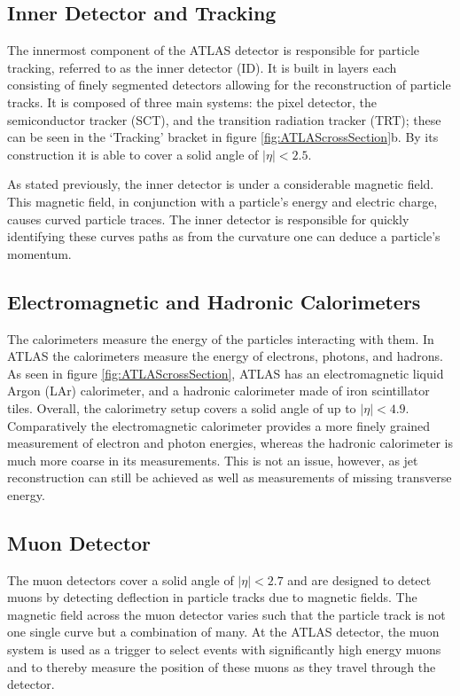 \subsection{Inner Detector and Tracking}
The innermost component of the ATLAS detector is responsible for particle tracking, referred to as the inner detector (ID).
It is built in layers each consisting of finely segmented detectors allowing for the reconstruction of particle tracks.
It is composed of three main systems: the pixel detector, the semiconductor tracker (SCT), and the transition radiation tracker (TRT); these can be seen in the `Tracking' bracket in figure \ref{fig:ATLAScrossSection}b.
By its construction it is able to cover a solid angle of $\left | \eta \right | < 2.5$.

As stated previously, the inner detector is under a considerable magnetic field. 
This magnetic field, in conjunction with a particle's energy and electric charge, causes curved particle traces.
The inner detector is responsible for quickly identifying these curves paths as from the curvature one can deduce a particle's momentum.

\subsection{Electromagnetic and Hadronic Calorimeters}
The calorimeters measure the energy of the particles interacting with them.
In ATLAS the calorimeters measure the energy of electrons, photons, and hadrons.
As seen in figure \ref{fig:ATLAScrossSection}, ATLAS has an electromagnetic liquid Argon (LAr) calorimeter, and a hadronic calorimeter made of iron scintillator tiles.
Overall, the calorimetry setup covers a solid angle of up to $\left | \eta \right | < 4.9$.
Comparatively the electromagnetic calorimeter provides a more finely grained measurement of electron and photon energies, whereas the hadronic calorimeter is much more coarse in its measurements.
This is not an issue, however, as jet reconstruction can still be achieved as well as measurements of missing transverse energy.

\subsection{Muon Detector}
The muon detectors cover a solid angle of $\left | \eta \right | < 2.7$ and are designed to detect muons by detecting deflection in particle tracks due to magnetic fields.
The magnetic field across the muon detector varies such that the particle track is not one single curve but a combination of many.
At the ATLAS detector, the muon system is used as a trigger to select events with significantly high energy muons and to thereby measure the position of these muons as they travel through the detector.


